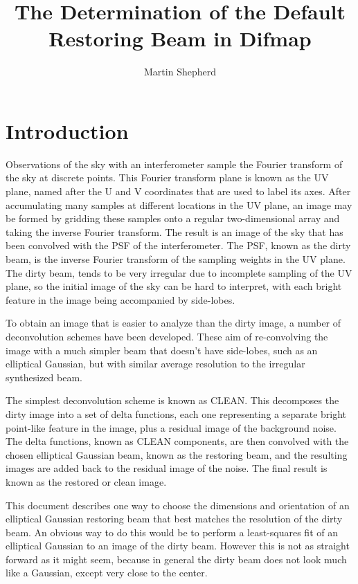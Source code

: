 \documentclass[11pt]{article}
\begin{document}
\title{The Determination of the Default Restoring Beam in Difmap}
\author{Martin Shepherd}
\maketitle

\section{Introduction}

Observations of the sky with an interferometer sample the Fourier
transform of the sky at discrete points. This Fourier transform plane
is known as the UV plane, named after the U and V coordinates that are
used to label its axes. After accumulating many samples at different
locations in the UV plane, an image may be formed by gridding these
samples onto a regular two-dimensional array and taking the inverse
Fourier transform. The result is an image of the sky that has been
convolved with the PSF of the interferometer. The PSF, known as the
dirty beam, is the inverse Fourier transform of the sampling weights
in the UV plane. The dirty beam, tends to be very irregular due to
incomplete sampling of the UV plane, so the initial image of the sky
can be hard to interpret, with each bright feature in the image being
accompanied by side-lobes.

To obtain an image that is easier to analyze than the dirty image, a
number of deconvolution schemes have been developed. These aim of
re-convolving the image with a much simpler beam that doesn’t have
side-lobes, such as an elliptical Gaussian, but with similar average
resolution to the irregular synthesized beam.

The simplest deconvolution scheme is known as CLEAN. This decomposes
the dirty image into a set of delta functions, each one representing a
separate bright point-like feature in the image, plus a residual image
of the background noise. The delta functions, known as CLEAN
components, are then convolved with the chosen elliptical Gaussian
beam, known as the restoring beam, and the resulting images are added
back to the residual image of the noise. The final result is known as
the restored or clean image.

This document describes one way to choose the dimensions and
orientation of an elliptical Gaussian restoring beam that best matches
the resolution of the dirty beam. An obvious way to do this would be
to perform a least-squares fit of an elliptical Gaussian to an image
of the dirty beam. However this is not as straight forward as it might
seem, because in general the dirty beam does not look much like a
Gaussian, except very close to the center.
\end{document}
